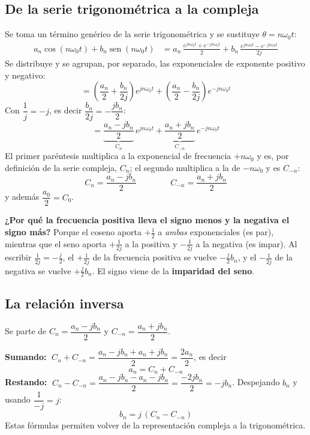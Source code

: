 \documentclass[11pt,a4paper]{article}
\DeclareMathOperator{\sen}{sen}
\begin{document}
\subsection{De la serie trigonométrica a la compleja}
Se toma un término genérico de la serie trigonométrica y se sustituye $\theta=n\omega_0t$:
\begin{align*}
  a_n\cos(n\omega_0t)+b_n\sen(n\omega_0t)
  &=a_n\,\frac{e^{jn\omega_0t}+e^{-jn\omega_0t}}{2}
   +b_n\,\frac{e^{jn\omega_0t}-e^{-jn\omega_0t}}{2j}
\end{align*}
Se distribuye y se agrupan, por separado, las exponenciales de exponente positivo y negativo:
\begin{equation*}
  =\left(\frac{a_n}{2}+\frac{b_n}{2j}\right)e^{jn\omega_0t}
   +\left(\frac{a_n}{2}-\frac{b_n}{2j}\right)e^{-jn\omega_0t}
\end{equation*}
Con $\dfrac{1}{j}=-j$, es decir $\dfrac{b_n}{2j}=-\dfrac{jb_n}{2}$:
\begin{equation*}
  =\underbrace{\frac{a_n-jb_n}{2}}_{C_n}\,e^{jn\omega_0t}
   +\underbrace{\frac{a_n+jb_n}{2}}_{C_{-n}}\,e^{-jn\omega_0t}
\end{equation*}
El primer paréntesis multiplica a la exponencial de frecuencia $+n\omega_0$ y es, por
definición de la serie compleja, $C_n$; el segundo multiplica a la de $-n\omega_0$ y es
$C_{-n}$:
\begin{equation*}
  \boxed{C_n=\frac{a_n-jb_n}{2}}\qquad\qquad\boxed{C_{-n}=\frac{a_n+jb_n}{2}}
\end{equation*}
y además $\dfrac{a_0}{2}=C_0$.

\textbf{¿Por qué la frecuencia positiva lleva el signo menos y la negativa el signo más?}
Porque el coseno aporta $+\tfrac{1}{2}$ a \emph{ambas} exponenciales (es par), mientras que
el seno aporta $+\tfrac{1}{2j}$ a la positiva y $-\tfrac{1}{2j}$ a la negativa (es impar).
Al escribir $\tfrac{1}{2j}=-\tfrac{j}{2}$, el $+\tfrac{1}{2j}$ de la frecuencia positiva se
vuelve $-\tfrac{j}{2}b_n$, y el $-\tfrac{1}{2j}$ de la negativa se vuelve $+\tfrac{j}{2}b_n$.
El signo viene de la \textbf{imparidad del seno}.

\subsection{La relación inversa}
Se parte de $C_n=\dfrac{a_n-jb_n}{2}$ y $C_{-n}=\dfrac{a_n+jb_n}{2}$.

\textbf{Sumando:}
$\;C_n+C_{-n}=\dfrac{a_n-jb_n+a_n+jb_n}{2}=\dfrac{2a_n}{2}$, es decir
\begin{equation*}
  \boxed{a_n=C_n+C_{-n}}
\end{equation*}
\textbf{Restando:}
$\;C_n-C_{-n}=\dfrac{a_n-jb_n-a_n-jb_n}{2}=\dfrac{-2jb_n}{2}=-jb_n$. Despejando $b_n$ y
usando $\dfrac{1}{-j}=j$:
\begin{equation*}
  \boxed{b_n=j\,(C_n-C_{-n})}
\end{equation*}
Estas fórmulas permiten volver de la representación compleja a la trigonométrica.
\end{document}
